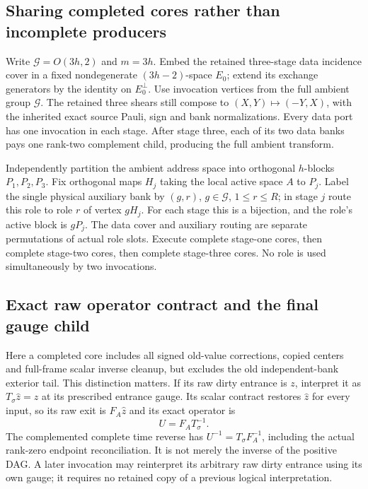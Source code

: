 \subsection{Sharing completed cores rather than incomplete producers}
Write $\mathcal G=O(3h,2)$ and $m=3h$. Embed the retained three-stage
data incidence cover in a fixed nondegenerate $(3h-2)$-space $E_0$;
extend its exchange generators by the identity on $E_0^\perp$.
Use invocation vertices from the full ambient group $\mathcal G$.
The retained three shears still compose to $(X,Y)\mapsto(-Y,X)$,
with the inherited exact source Pauli, sign and bank normalizations.
Every data port has one invocation in each stage. After stage three,
each of its two data banks pays one rank-two complement child, producing
the full ambient transform.

Independently partition the ambient address space into orthogonal
$h$-blocks $P_1,P_2,P_3$. Fix orthogonal maps $H_j$ taking the local
active space $A$ to $P_j$. Label the single physical auxiliary bank by
$(g,r)$, $g\in\mathcal G$, $1\le r\le R$; in stage $j$ route this role
to role $r$ of vertex $gH_j$. For each stage this is a bijection, and
the role's active block is $gP_j$. The data cover and auxiliary routing
are separate permutations of actual role slots. Execute complete
stage-one cores, then complete stage-two cores, then complete stage-three
cores. No role is used simultaneously by two invocations.

\subsection{Exact raw operator contract and the final gauge child}
Here a completed core includes all signed old-value corrections,
copied centers and full-frame scalar inverse cleanup, but excludes the
old independent-bank exterior tail. This distinction matters.
If its raw dirty entrance is $z$, interpret it as
$T_\sigma\widehat z=z$ at its prescribed entrance gauge.
Its scalar contract restores $\widehat z$ for every input, so its raw
exit is $F_A\widehat z$ and its exact operator is
\[
 U=F_AT_\sigma^{-1}.
\]
The complemented complete time reverse has $U^{-1}=T_\sigma F_A^{-1}$,
including the actual rank-zero endpoint reconciliation. It is not merely
the inverse of the positive DAG. A later invocation may reinterpret its
arbitrary raw dirty entrance using its own gauge; it requires no retained
copy of a previous logical interpretation.

